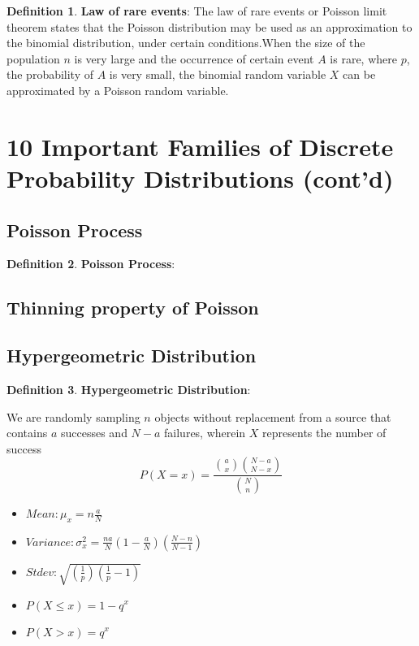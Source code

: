 \documentclass[12pt]{amsart}
\theoremstyle{definition}
\newtheorem{definition}{Definition} %
\numberwithin{equation}{theorem}    %
\begin{document}
\begin{definition}
    \textbf{Law of rare events}:
    The law of rare events or Poisson limit theorem states that the Poisson distribution may be used as an approximation to the binomial distribution, under certain conditions.When the size of the population $n$ is very large and the occurrence of certain event $A$ is rare, where $p$, the probability of $A$ is very small, the binomial random variable $X$ can be approximated by a Poisson random variable.
\end{definition}

\section*{10 Important Families of Discrete Probability Distributions (cont’d)}

\subsection*{Poisson Process}

\begin{definition}
    \textbf{Poisson Process}:


\end{definition}

\subsection*{Thinning property of Poisson}

\subsection*{Hypergeometric Distribution}

\begin{definition}
    \textbf{Hypergeometric Distribution}:

\end{definition}
    We are randomly sampling $n$ objects without replacement from a source that contains $a$ successes and $N-a$ failures, wherein $X$ represents the number of success 
    $$P(X=x) =\frac{{ a\choose x}{ N-a \choose N-x}}{{N \choose n}}$$
    \begin{itemize}
        \item $Mean:\mu_x = n\frac{a}{N}$
        \item $Variance: \sigma_x^2 = \frac{na}{N}(1-\frac{a}{N})(\frac{N-n}{N-1})$
        \item $Stdev: \sqrt{(\frac{1}{p})(\frac{1}{p}-1)}$
        \item $P(X\leq x) = 1-q^x$
        \item $P(X > x) = q^x$
    \end{itemize}
\end{document}
